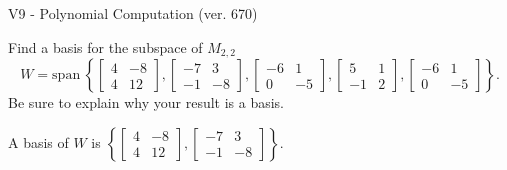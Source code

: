 \begin{exercise}
  \begin{exerciseTitle}V9 - Polynomial Computation (ver. 670)\end{exerciseTitle}
  \begin{exerciseStatement}
    Find a basis for the subspace of \(M_{2,2}\) 
\[W=\mathrm{span}\ \left\{\left[\begin{array}{cc}
4 & -8 \\
4 & 12
\end{array}\right] , \left[\begin{array}{cc}
-7 & 3 \\
-1 & -8
\end{array}\right] , \left[\begin{array}{cc}
-6 & 1 \\
0 & -5
\end{array}\right] , \left[\begin{array}{cc}
5 & 1 \\
-1 & 2
\end{array}\right] , \left[\begin{array}{cc}
-6 & 1 \\
0 & -5
\end{array}\right]\right\}.\]
 Be sure to explain why your result is a basis.


  \end{exerciseStatement}
  \begin{exerciseAnswer}
   A basis of \(W\) is  \(\left\{\left[\begin{array}{cc}
4 & -8 \\
4 & 12
\end{array}\right] , \left[\begin{array}{cc}
-7 & 3 \\
-1 & -8
\end{array}\right]\right\}\).
  


  \end{exerciseAnswer}
\end{exercise}